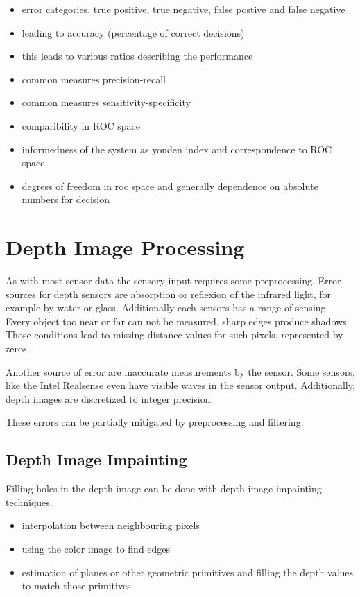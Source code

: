 \begin{itemize}
    \item error categories, true positive, true negative, false postive and false negative
    \item leading to accuracy (percentage of correct decisions)
    \item this leads to various ratios describing the performance 
    \item common measures precision-recall
    \item common measures sensitivity-specificity
    \item comparibility in ROC space
    \item informedness of the system as youden index and correspondence to ROC space
    \item degress of freedom in roc space and generally dependence on absolute numbers for decision 
\end{itemize}

\section{Depth Image Processing}

As with most sensor data the sensory input requires some preprocessing.
Error sources for depth sensors are absorption or reflexion of the infrared light, for example by water or glass.
Additionally each sensors has a range of sensing.
Every object too near or far can not be measured, sharp edges produce shadows.
Those conditions lead to missing distance values for such pixels, represented by zeros.

Another source of error are inaccurate measurements by the sensor.
Some sensors, like the Intel Realsense even have visible waves in the sensor output.
Additionally, depth images are discretized to integer precision.

These errors can be partially mitigated by preprocessing and filtering.

\subsection{Depth Image Impainting}

Filling holes in the depth image can be done with depth image impainting techniques.

\begin{itemize}
    \item interpolation between neighbouring pixels
    \item using the color image to find edges
    \item estimation of planes or other geometric primitives and filling the depth values to match those primitives
\end{itemize}

